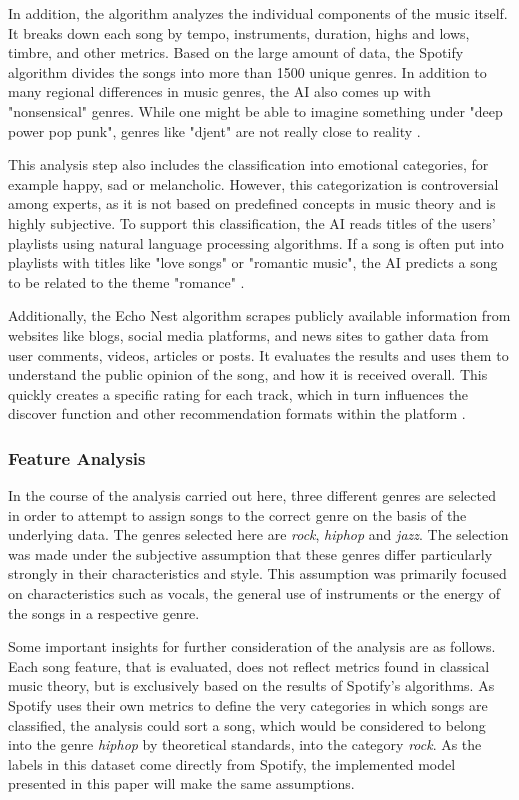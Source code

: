 In addition, the algorithm analyzes the individual components of the music itself. 
It breaks down each song by tempo, instruments, duration, highs and lows, timbre, and other metrics. 
Based on the large amount of data, the Spotify algorithm divides the songs into more than 1500 unique genres. 
In addition to many regional differences in music genres, the AI also comes up with "nonsensical" genres.
While one might be able to imagine something under "deep power pop punk",
genres like "djent" are not really close to reality \cite[]{Boyd2019}.

This analysis step also includes the classification into emotional categories, for example happy, sad or
melancholic. However, this categorization is controversial among experts, as it is not based on predefined concepts in music
theory and is highly subjective.
To support this classification, the AI reads titles of the users' playlists using natural language processing algorithms.
If a song is often put into playlists with titles like "love songs" or "romantic music",
the AI predicts a song to be related to the theme "romance" \cite[]{Boyd2019}.

Additionally, the Echo Nest algorithm scrapes publicly available information from websites like blogs, social media platforms,
and news sites to gather data from user comments, videos, articles or posts.
It evaluates the results and uses them to understand the public opinion of the song,
and how it is received overall.
This quickly creates a specific rating for each track, which in turn influences the
discover function and other recommendation formats within the platform \cite[]{Boyd2019}.

\subsubsection{Feature Analysis}

In the course of the analysis carried out here, three different genres are selected in order
to attempt to assign songs to the correct genre on the basis of the underlying data. 
The genres selected here are \emph{rock}, \emph{hiphop} and \emph{jazz}. The selection was made under the
subjective assumption that these genres differ particularly strongly in their characteristics and style. 
This assumption was primarily focused on characteristics such as vocals, the general use of instruments
or the energy of the songs in a respective genre.

Some important insights for further consideration of the analysis are as follows.
Each song feature, that is evaluated, does not reflect metrics found in classical music theory, 
but is exclusively based on the results of Spotify's algorithms.
As Spotify uses their own metrics to define the very categories in which songs are classified,
the analysis could sort a song, which would be considered to belong into the genre \emph{hiphop} by theoretical
standards, into the category \emph{rock}. As the labels in this dataset come directly from Spotify,
the implemented model presented in this paper will make the same assumptions.

